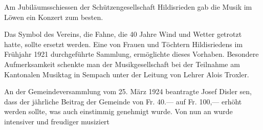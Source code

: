 \begin{multicols}{2}
    Am Jubiläumsschiessen der Schützengesellschaft Hildisrieden gab die Musik im
    Löwen ein Konzert zum besten.

    Das Symbol des Vereins, die Fahne, die 40 Jahre Wind und Wetter getrotzt
    hatte, sollte ersetzt werden. Eine von Frauen und Töchtern Hildisriedens im
    Frühjahr 1921 durchgeführte Sammlung, ermöglichte dieses Vorhaben. Besondere
    Aufmerksamkeit schenkte man der Musikgesellschaft bei der Teilnahme am
    Kantonalen Musiktag in Sempach unter der Leitung von Lehrer Alois Troxler.

    An der Gemeindeversammlung vom 25. März 1924 beantragte Josef Disler sen,
    dass der jährliche Beitrag der Gemeinde von Fr. 40.— auf Fr. 100,— erhöht
    werden sollte, was auch einstimmig genehmigt wurde. Von nun an wurde
    intensiver und freudiger musiziert


\end{multicols}

